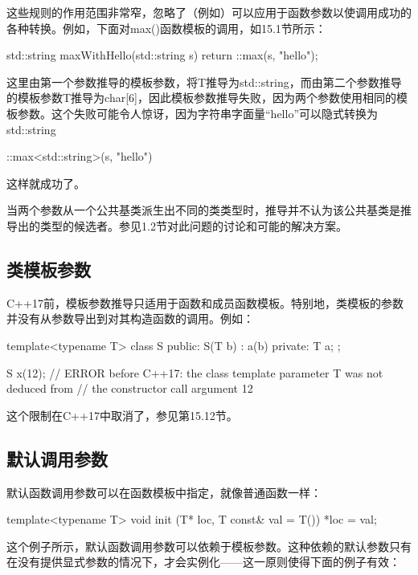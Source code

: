 这些规则的作用范围非常窄，忽略了（例如）可以应用于函数参数以使调用成功的各种转换。例如，下面对max()函数模板的调用，如15.1节所示：

\begin{cpp}
std::string maxWithHello(std::string s) {
	return ::max(s, "hello");
}
\end{cpp}

这里由第一个参数推导的模板参数，将T推导为std::string，而由第二个参数推导的模板参数T推导为char[6]，因此模板参数推导失败，因为两个参数使用相同的模板参数。这个失败可能令人惊讶，因为字符串字面量“hello”可以隐式转换为std::string

\begin{cpp}
::max<std::string>(s, "hello")
\end{cpp}

这样就成功了。

当两个参数从一个公共基类派生出不同的类类型时，推导并不认为该公共基类是推导出的类型的候选者。参见1.2节对此问题的讨论和可能的解决方案。

\subsection{类模板参数}

C++17前，模板参数推导只适用于函数和成员函数模板。特别地，类模板的参数并没有从参数导出到对其构造函数的调用。例如：

\begin{cpp}
template<typename T>
class S {
	public:
	S(T b) : a(b) {
	}
	private:
	T a;
};

S x(12); // ERROR before C++17: the class template parameter T was not deduced from
// the constructor call argument 12
\end{cpp}

这个限制在C++17中取消了，参见第15.12节。

\subsection{默认调用参数}

默认函数调用参数可以在函数模板中指定，就像普通函数一样：

\begin{cpp}
template<typename T>
void init (T* loc, T const& val = T()) {
	*loc = val;
}
\end{cpp}

这个例子所示，默认函数调用参数可以依赖于模板参数。这种依赖的默认参数只有在没有提供显式参数的情况下，才会实例化——这一原则使得下面的例子有效：

